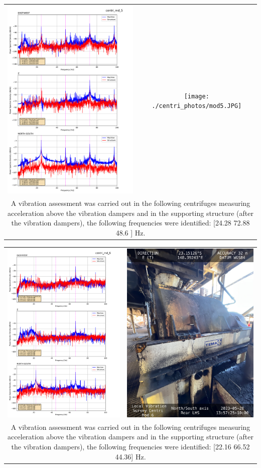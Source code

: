 \documentclass{article}
\begin{document}
\newpage
\begin{center}
\begin{tabular*}{0.6\textwidth}{@{\extracolsep{\fill}}cc}
\includegraphics[width=0.3\linewidth, valign=c]{./centri_md_5_comparison.pdf} &
\texttt{[image: ./centri\_photos/mod5.JPG]} \\
\multicolumn{2}{|p{0.6\textwidth}|}{A vibration assessment was carried out in the following centrifuges measuring acceleration above the vibration dampers and in the supporting structure (after the vibration dampers), the following frequencies were identified: [24.28 72.88 48.6 ] Hz.
} \\
\end{tabular*}
\end{center}
\newpage
\begin{center}
\begin{tabular*}{0.6\textwidth}{@{\extracolsep{\fill}}cc}
\includegraphics[width=0.3\linewidth, valign=c]{./centri_md_6_comparison.pdf} &
\includegraphics[width=0.3\linewidth, valign=c]{./centri_photos/mod6.JPG} \\
\multicolumn{2}{|p{0.6\textwidth}|}{A vibration assessment was carried out in the following centrifuges measuring acceleration above the vibration dampers and in the supporting structure (after the vibration dampers), the following frequencies were identified: [22.16 66.52 44.36] Hz.
} \\
\end{tabular*}
\end{center}
\newpage
\end{document}
